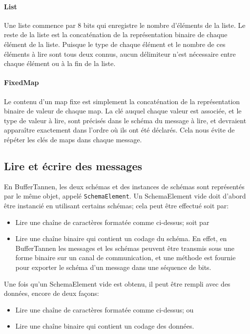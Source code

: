 \paragraph{List} Une liste commence par 8 bits qui enregistre le nombre d'éléments de la liste. Le reste de la liste est la concaténation de la représentation binaire de chaque élément de la liste. Puisque le type de chaque élément et le nombre de ces éléments à lire sont tous deux connus, aucun délimiteur n'est nécessaire entre chaque élément ou à la fin de la liste.

\paragraph{FixedMap} Le contenu d'un map fixe est simplement la concaténation de la représentation binaire de valeur de chaque map. La clé auquel chaque valeur est associée, et le type de valeur à lire, sont précisés dans le schéma du message à lire, et devraient apparaître exactement dans l'ordre où ils ont été déclarés. Cela nous évite de répéter les clés de maps dans chaque message.

\subsection{Lire et écrire des messages}

En BufferTannen, les deux schémas et des instances de schémas sont représentés par le même objet, appelé \verb+SchemaElement+. Un SchemaElement vide doit d'abord être instancié en utilisant certains schémas; cela peut être effectué soit par:

\begin{itemize}
\item Lire une chaîne de caractères formatée comme ci-dessus; soit par

\item Lire une chaîne binaire qui contient un codage du schéma. En effet, en BufferTannen les messages et les schémas peuvent être transmis sous une forme binaire sur un canal de communication, et une méthode est fournie pour exporter le schéma d'un message dans une séquence de bits.
\end{itemize}

Une fois qu'un SchemaElement vide est obtenu, il peut être rempli avec des données, encore de deux façons:

\begin{itemize}
\item Lire une chaîne de caractères formatée comme ci-dessus; ou

\item Lire une chaîne binaire qui contient un codage des données.
\end{itemize}


